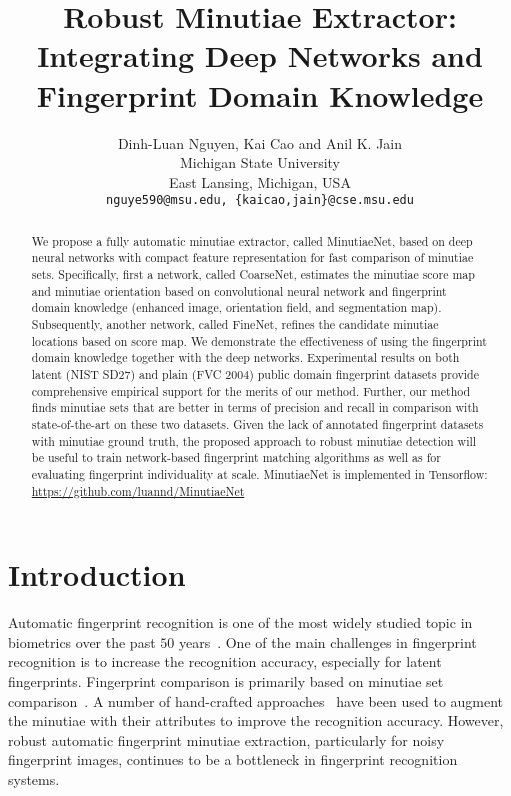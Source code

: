\documentclass[10pt,twocolumn,letterpaper]{article}
\begin{document}
\title{Robust Minutiae Extractor:\\ Integrating Deep Networks and Fingerprint Domain Knowledge}

\author{Dinh-Luan Nguyen, Kai Cao and Anil K. Jain\\
Michigan State University\\
East Lansing, Michigan, USA\\
{\tt\small nguye590@msu.edu, \{kaicao,jain\}@cse.msu.edu}
}

\maketitle
\thispagestyle{empty}

\begin{abstract}
	We propose a fully automatic minutiae extractor, called MinutiaeNet, based on deep neural networks with compact feature representation for fast comparison of minutiae sets. Specifically, first a network, called CoarseNet, estimates the minutiae score map and minutiae orientation based on convolutional neural network and fingerprint domain knowledge (enhanced image, orientation field, and segmentation map). Subsequently, another network, called FineNet, refines the candidate minutiae locations based on score map. We demonstrate the effectiveness of using the fingerprint domain knowledge together with the deep networks. Experimental results on both latent (NIST SD27) and plain (FVC 2004) public domain fingerprint datasets provide comprehensive empirical support for the merits of our method. Further, our method finds minutiae sets that are better in terms of precision and recall in comparison with state-of-the-art on these two datasets. Given the lack of annotated fingerprint datasets with minutiae ground truth, the proposed approach to robust minutiae detection will be useful to train network-based fingerprint matching algorithms as well as for evaluating fingerprint individuality at scale. MinutiaeNet is implemented in Tensorflow: \href{https://github.com/luannd/MinutiaeNet}{https://github.com/luannd/MinutiaeNet} \end{abstract}

\section{Introduction}
Automatic fingerprint recognition is one of the most widely studied topic in biometrics over the past $50$ years~\cite{jain201650}. One of the main challenges in fingerprint recognition is to increase the recognition accuracy, especially for latent fingerprints. Fingerprint comparison is primarily based on minutiae set comparison~\cite{zhao2007preprocessing, jain2007pores}. A number of hand-crafted approaches~\cite{jain1997line,zhao2007preprocessing} have been used to augment the minutiae with their attributes to improve the recognition accuracy. However, robust automatic fingerprint minutiae extraction, particularly for noisy fingerprint images, continues to be a bottleneck in fingerprint recognition systems.
\end{document}
